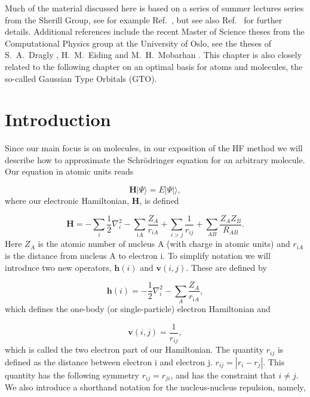 \documentclass[a4paper,norsk,11pt,twoside]{report}
\begin{document}
Much of the material discussed here is based on a series of summer lectures
series from the Sherill Group, see for example Ref.~\cite{ref111111}, but see also 
Ref.~\cite{ref222222} for further details. Additional references include the recent Master of Science theses from the 
Computational Physics group at the University of Oslo, see the theses of
S.~A.~Dragly \cite{sadragly}, H.~M.~Eiding \cite{hmeiding} and M.~H.~Mobarhan \cite{mhmobarhan}. 
This chapter is also closely
related to the following chapter on an optimal basis for atoms and molecules, the so-called  Gaussian Type Orbitals (GTO).

\section{Introduction}
Since our main focus is on molecules, in our exposition of  
the HF method we will describe how to approximate the Schr\"odringer equation for an arbitrary molecule. 
Our equation in atomic units reads	

\begin{equation}
\textbf{H} | \Psi \rangle = E | \Psi |\rangle,
\label{hartreefock_1}
\end{equation}
where our electronic Hamiltonian, $\textbf{H}$, is defined

\begin{equation}
\textbf{H} = 
- \sum_i \frac{1}{2} \nabla_i^2 
- \sum_{iA} \frac{Z_A}{r_{iA}}
+ \sum_{i>j} \frac{1}{r_{ij}} 
+ \sum_{AB} \frac{Z_A Z_B}{R_{AB}} .
\end{equation}
Here $Z_A$ is the atomic number of nucleus A (with charge in atomic units) 
and $r_{iA}$ is the distance from nucleus A to electron i. 
To simplify notation we will introduce two new operators, $\textbf{h}(i)$ and $\textbf{v}(i,j)$. These are defined by

\begin{equation}
\textbf{h}(i) = - \frac{1}{2} \nabla_i^2 - \sum_A \frac{Z_A}{r_{iA}}, \label{single_particle_hf}
\end{equation}
which defines the one-body (or single-particle) electron Hamiltonian and

\begin{equation}
\textbf{v}(i,j) = \frac{1}{r_{ij}},
\end{equation}
which is called the two electron part of our Hamiltonian. The quantity
$r_{ij}$ is defined as the distance between electron i and electron
j. $r_{ij} = |r_i - r_j|$. This quantity has the following symmetry
$r_{ij} = r_{ji}$, and has the constraint that $i \not= j$. We also
introduce a shorthand notation for the nucleus-nucleus repulsion, namely,
\end{document}
